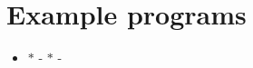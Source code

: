 \section{Example programs}
\label{group__examp}
\begin{itemize}
\item $\ast$ - $\ast$ - \end{itemize}


